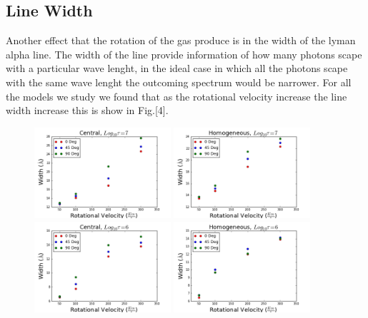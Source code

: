 \documentclass[usenatbib]{mn2e}
\begin{document}
\subsection{Line Width}
\label{sec:LW}

Another effect that the rotation of the gas produce is in the  width
of the lyman alpha line. The width of the line provide information of
how many photons scape with a particular wave lenght, in the
ideal case in which all the photons scape with the same wave lenght
the outcoming spectrum would be narrower. For all the models we study we
found that as the rotational velocity increase the line width
increase this is show in Fig.[4].\\ 
 

\begin{figure}
    \includegraphics[width=0.45\textwidth]{Width7Central.png}
    \includegraphics[width=0.45\textwidth]{Width7Homogeneous.png}
    \includegraphics[width=0.45\textwidth]{Width6.png}
    \includegraphics[width=0.45\textwidth]{Width6HOM.png}

\end{figure}
\end{document}
